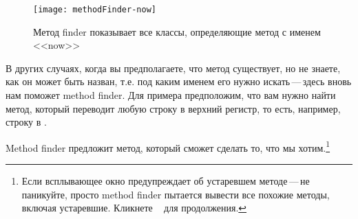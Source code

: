 \documentclass[a4paper,10pt,twoside]{book}
\begin{document}
\begin{figure}[hbt]
\centerline {\texttt{[image: methodFinder-now]}}
\caption{Метод finder показывает все классы, определяющие метод
с именем <<now>>
}
\end{figure}


В других случаях, когда вы предполагаете, что метод существует,
но не знаете, как он может быть назван, т.е. под каким именем
его нужно искать\,---\,здесь вновь нам поможет method finder.
Для примера предположим, что вам нужно найти метод, который
переводит любую строку в верхний регистр, то есть, например,
строку  в . 


\noindent
Method finder предложит метод, который сможет сделать то,
что мы хотим.\footnote{Если всплывающее окно предупреждает об
устаревшем методе\,---\,не паникуйте, просто method finder пытается
вывести все похожие методы, включая устаревшие.
Кликнете ~ для продолжения.} 

\end{document}
